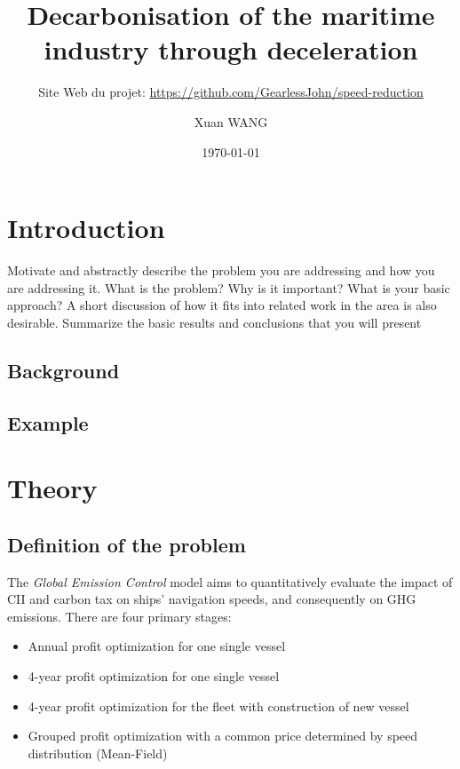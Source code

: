 \documentclass[a4paper,12pt]{article}
\author{Xuan WANG}
\date{\today}
\title{Decarbonisation of the maritime industry through deceleration}
\subtitle{Site Web du projet: \url{https://github.com/GearlessJohn/speed-reduction}}%
\begin{document}
\maketitle

\tableofcontents




\renewcommand{\thepage}{\arabic{page}}


\newpage
\setcounter{page}{1}
\section{Introduction}

Motivate and abstractly describe the problem you are addressing and how you are
addressing it. What is the problem? Why is it important? What is your basic approach? A
short discussion of how it fits into related work in the area is also desirable. Summarize the
basic results and conclusions that you will present
\subsection{Background}

\subsection{Example}



\section{Theory}

\subsection{Definition of the problem}

The \textit{Global Emission Control} model aims to quantitatively evaluate the impact of CII and carbon tax on ships' navigation speeds, and consequently on GHG emissions. There are four primary stages:
\begin{itemize}
	\item Annual profit optimization for one single vessel
	\item 4-year profit optimization for one single vessel
	\item 4-year profit optimization for the fleet with construction of new vessel
	\item Grouped profit optimization with a common price determined by speed distribution (Mean-Field) \\
\end{itemize}
\end{document}
